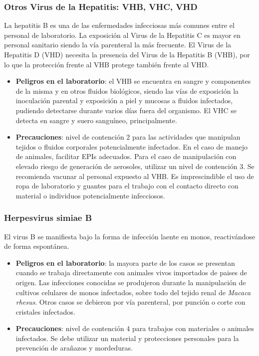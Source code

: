 \subsubsection{Otros Virus de la Hepatitis: VHB, VHC, VHD}
La hepatitis B es una de las enfermedades infecciosas más comunes entre el personal de laboratorio. La exposición al Virus de la Hepatitis C es mayor en personal sanitario siendo la vía parenteral la más frecuente. El Virus de la Hepatitis D (VHD) necesita la presencia del Virus de la Hepatitis B (VHB), por lo que la protección frente al VHB protege también frente al VHD.
\begin{itemize}[itemsep=0pt,parsep=0pt,topsep=0pt,partopsep=0pt]
    \item \textbf{Peligros en el laboratorio}: el VHB se encuentra en sangre y componentes de la misma y en otros fluidos biológicos, siendo las vías de exposición la inoculación parental y exposición a piel y mucosas a fluidos infectados, pudiendo detectarse durante varios días fuera del organismo. El VHC se detecta en sangre y suero sanguíneo, principalmente.
    \item \textbf{Precauciones}: nivel de contención 2 para las actividades que manipulan tejidos o fluidos corporales potencialmente infectados. En el caso de manejo de animales, facilitar EPIs adecuados. Para el caso de manipulación con elevado riesgo de generación de aerosoles, utilizar un nivel de contención 3. Se recomienda vacunar al personal expuesto al VHB. Es imprescindible el uso de ropa de laboratorio y guantes para el trabajo con el contacto directo con material o individuos potencialmente infecciosos.
\end{itemize}
\subsubsection{Herpesvirus simiae B}
El virus B se manifiesta bajo la forma de infección laente en monos, reactivándose de forma espontánea.
\begin{itemize}[itemsep=0pt,parsep=0pt,topsep=0pt,partopsep=0pt]
    \item \textbf{Peligros en el laboratorio}: la mayora parte de los casos se presentan cuando se trabaja directamente con animales vivos importados de paises de origen. Las infecciones conocidas se produjeron durante la manipulación de cultivos celulares de monos infectados, sobre todo del tejido renal de \textit{Macaca rhesus}. Otros casos se debieron por vía parenteral, por punción o corte con cristales infectados.
    \item \textbf{Precauciones}: nivel de contención 4 para trabajos con materiales o animales infectados. Se debe utilizar un material y protecciones personales para la prevención de arañazos y mordeduras.
\end{itemize} 
